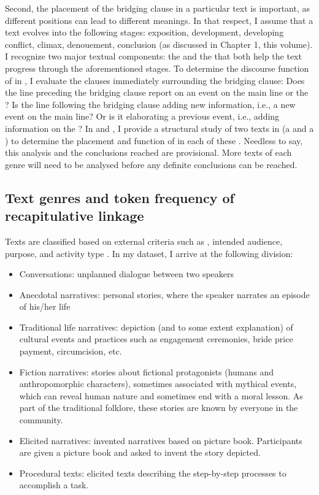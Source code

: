 \documentclass[output=paper]{LSP/langsci}
\begin{document}
Second, the placement of the bridging clause in a particular text is important, as different positions can lead to different meanings. In that respect, I assume that a text evolves into the following stages: exposition, development, developing conflict, climax, denouement, conclusion (as discussed in Chapter 1, this volume). I recognize two major textual components: the  and the  \citep[][14--17]{longacre83} that both help the text progress through the aforementioned stages. To determine the discourse function of  in , I evaluate the clauses immediately surrounding the bridging clause: Does the line preceding the bridging clause report on an event on the main line or the ? Is the line following the bridging clause adding new information, i.e., a new event on the main line? Or is it elaborating a previous event, i.e., adding information on the ? In  and , I provide a structural study of two texts in  (a  and a ) to determine the placement and function of  in each of these . Needless to say, this analysis and the conclusions reached are provisional. More texts of each genre will need to be analysed before any definite conclusions can be reached.   

\subsection{Text genres and token frequency of recapitulative linkage} 
\label{Gusec:frequency}
Texts are classified based on external criteria such as , intended audience, purpose, and activity type \citep[][38]{lee01}. In my  dataset, I arrive at the following division: 

\begin{itemize}
\item  Conversations: unplanned dialogue between two speakers
\item Anecdotal narratives: personal stories, where the speaker narrates an episode of his/her life
\item Traditional life narratives: depiction (and to some extent explanation) of cultural events and practices such as engagement ceremonies, bride price payment, circumcision, etc.
\item Fiction narratives: stories about fictional protagonists (humans and anthropomorphic characters), sometimes associated with mythical events, which can reveal human nature and sometimes end with a moral lesson. As part of the traditional folklore, these stories are known by everyone in the community.
\item Elicited narratives: invented narratives based on picture book. Participants are given a picture book and asked to invent the story depicted.
\item Procedural texts: elicited texts describing the step-by-step processes to accomplish a task. 
\end{itemize}
\end{document}
